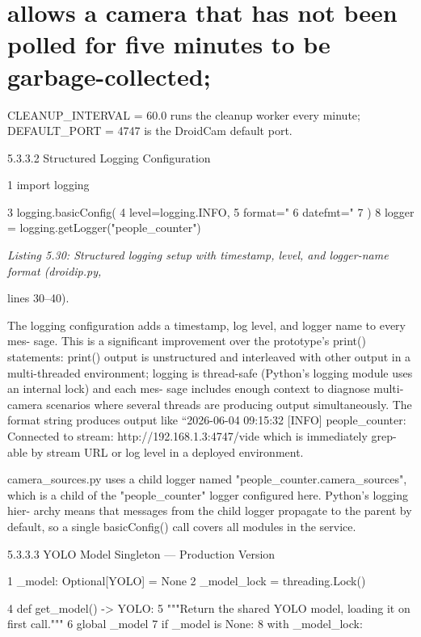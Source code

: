 \section{allows a camera that has not been polled for ﬁve minutes to be garbage-collected;}

CLEANUP\_INTERVAL = 60.0 runs the cleanup worker every minute; DEFAULT\_PORT =
4747 is the DroidCam default port.






5.3.3.2 Structured Logging Conﬁguration

1 import logging

3 logging.basicConfig(
4 level=logging.INFO,
5 format="%
6 datefmt="%
7 )
8 logger = logging.getLogger("people\_counter")


\textit{Listing 5.30: Structured logging setup with timestamp, level, and logger-name format (droidip.py,}

lines 30--40).


The logging conﬁguration adds a timestamp, log level, and logger name to every mes-
sage. This is a signiﬁcant improvement over the prototype's print() statements: print()
output is unstructured and interleaved with other output in a multi-threaded environment;
logging is thread-safe (Python's logging module uses an internal lock) and each mes-
sage includes enough context to diagnose multi-camera scenarios where several threads
are producing output simultaneously. The format string produces output like ``2026-06-04
09:15:32 [INFO] people\_counter: Connected to stream: http://192.168.1.3:4747/vide
which is immediately grep-able by stream URL or log level in a deployed environment.

camera\_sources.py uses a child logger named "people\_counter.camera\_sources",
which is a child of the "people\_counter" logger conﬁgured here. Python's logging hier-
archy means that messages from the child logger propagate to the parent by default, so a
single basicConfig() call covers all modules in the service.


5.3.3.3 YOLO Model Singleton --- Production Version

1 \_model: Optional[YOLO] = None
2 \_model\_lock = threading.Lock()

4 def get\_model() -> YOLO:
5 """Return the shared YOLO model, loading it on first call."""
6 global \_model
7 if \_model is None:
8 with \_model\_lock:




